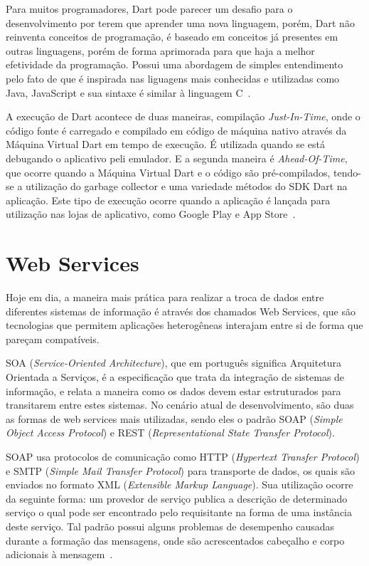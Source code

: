 Para muitos programadores, Dart pode parecer um desafio para o desenvolvimento por terem que aprender uma nova linguagem, porém, Dart não reinventa conceitos de programação, é baseado em conceitos já presentes em outras linguagens, porém de forma aprimorada para que haja a melhor efetividade da programação.
Possui uma abordagem de simples entendimento pelo fato de que é inspirada nas liguagens mais conhecidas e utilizadas como Java, JavaScript e sua sintaxe é similar à linguagem C~\cite{clow2019flutter}.

A execução de Dart acontece de duas maneiras, compilação \textit{Just-In-Time}, onde o código fonte é carregado e compilado em código de máquina nativo através da Máquina Virtual Dart em tempo de execução.
É utilizada quando se está debugando o aplicativo peli emulador.
E a segunda maneira é \textit{Ahead-Of-Time}, que ocorre quando a Máquina Virtual Dart e o código são pré-compilados, tendo-se a utilização do garbage collector e uma variedade métodos do SDK Dart na aplicação.
Este tipo de execução ocorre quando a aplicação é lançada para utilização nas lojas de aplicativo, como Google Play e App Store~\cite{napoli2019beginning}.


\section{Web Services}\label{sec:web-services}


Hoje em dia, a maneira mais prática para realizar a troca de dados entre diferentes sistemas de informação é através dos chamados Web Services\cite{tihomirovs2016webservices}, que são tecnologias que permitem aplicações heterogêneas interajam entre si de forma que pareçam compatíveis\cite{eulalio2016webservices}.


SOA (\textit{Service-Oriented Architecture}), que em português significa Arquitetura Orientada a Serviços, é a especificação que trata da integração de sistemas de informação, e relata a maneira como os dados devem estar estruturados para transitarem entre estes sistemas\cite{eulalio2016webservices}.
No cenário atual de desenvolvimento, são duas as formas de web services mais utilizadas, sendo eles o padrão SOAP (\textit{Simple Object Access Protocol}) e REST (\textit{Representational State Transfer Protocol}).

SOAP usa protocolos de comunicação como HTTP (\textit{Hypertext Transfer Protocol}) e SMTP (\textit{Simple Mail Transfer Protocol}) para transporte de dados, os quais são enviados no formato XML (\textit{Extensible Markup Language}). Sua utilização ocorre da seguinte forma: um provedor de serviço publica a descrição de determinado serviço o qual pode ser encontrado pelo requisitante na forma de uma instância deste serviço.
Tal padrão possui alguns problemas de desempenho causadas durante a formação das mensagens, onde são acrescentados cabeçalho e corpo adicionais à mensagem~\cite{tihomirovs2016webservices}.

